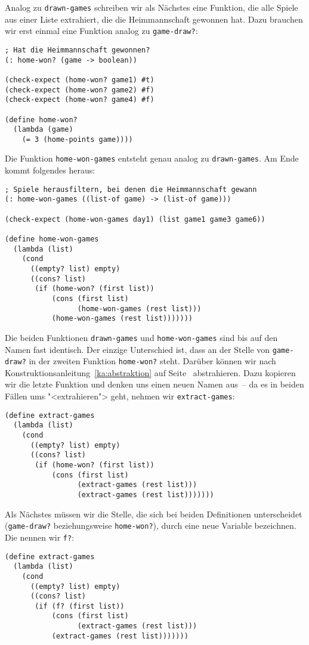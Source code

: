 Analog zu \lstinline{drawn-games} schreiben wir als Nächstes eine
Funktion, die alle Spiele aus einer Liste extrahiert, die die Heimmannschaft
gewonnen hat.  Dazu brauchen wir erst einmal eine Funktion analog zu
\lstinline{game-draw?}:
%
\begin{lstlisting}
; Hat die Heimmannschaft gewonnen?
(: home-won? (game -> boolean))

(check-expect (home-won? game1) #t)
(check-expect (home-won? game2) #f)
(check-expect (home-won? game4) #f)

(define home-won?
  (lambda (game)
    (= 3 (home-points game))))
\end{lstlisting}
%
Die Funktion \lstinline{home-won-games} entsteht genau analog zu
\lstinline{drawn-games}.  Am Ende kommt folgendes heraus:
%
\begin{lstlisting}
; Spiele herausfiltern, bei denen die Heimmannschaft gewann
(: home-won-games ((list-of game) -> (list-of game)))

(check-expect (home-won-games day1) (list game1 game3 game6))

(define home-won-games
  (lambda (list)
    (cond
      ((empty? list) empty)
      ((cons? list)
       (if (home-won? (first list))
           (cons (first list)
                 (home-won-games (rest list)))
           (home-won-games (rest list)))))))
\end{lstlisting}
%
Die beiden Funktionen \lstinline{drawn-games} und
\lstinline{home-won-games} sind bis auf den Namen fast identisch.  Der
einzige Unterschied ist, dass an der Stelle von \lstinline{game-draw?}
in der zweiten Funktion \lstinline{home-won?} steht.  Darüber können
wir nach Konstruktionsanleitung~\ref{ka:abstraktion} auf
Seite~\pageref{ka:abstraktion} abstrahieren.  Dazu kopieren wir die
letzte Funktion und denken uns einen neuen Namen aus~-- da es in
beiden Fällen ums "<extrahieren"> geht, nehmen wir
\lstinline{extract-games}:
%
\begin{lstlisting}
(define extract-games
  (lambda (list)
    (cond
      ((empty? list) empty)
      ((cons? list)
       (if (home-won? (first list))
           (cons (first list)
                 (extract-games (rest list)))
                 (extract-games (rest list)))))))
\end{lstlisting}
%
Als Nächstes müssen wir die Stelle, die sich bei beiden Definitionen
unterscheidet (\lstinline{game-draw?} beziehungsweise
\lstinline{home-won?}), durch eine neue Variable bezeichnen.  Die nennen wir
\lstinline{f?}:
%
\begin{lstlisting}
(define extract-games
  (lambda (list)
    (cond
      ((empty? list) empty)
      ((cons? list)
       (if (f? (first list))
           (cons (first list)
                 (extract-games (rest list)))
           (extract-games (rest list)))))))
\end{lstlisting}
